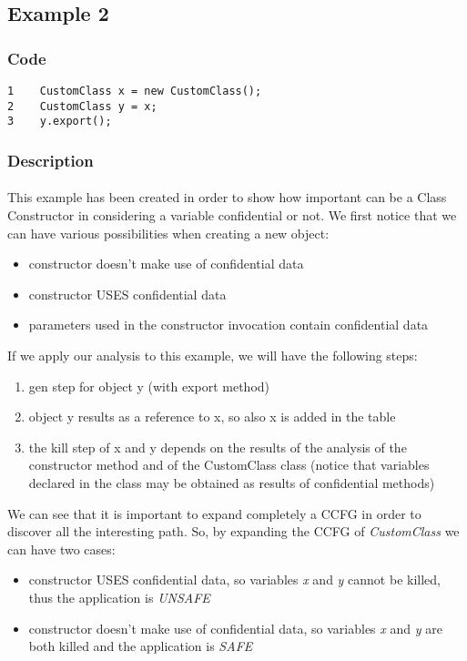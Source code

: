 \documentclass[letterpaper,twocolumn,10pt]{article}
\begin{document}
\subsection{Example 2}

\subsubsection{Code}
\begin{verbatim}
1    CustomClass x = new CustomClass();
2    CustomClass y = x;
3    y.export();
\end{verbatim}

\subsubsection{Description}
\paragraph{}
This example has been created in order to show how important can be a Class Constructor in considering a variable confidential or not. We first notice that we can have various possibilities when creating a new object:
\begin{itemize}
  \item constructor doesn't make use of confidential data
  \item constructor USES confidential data
  \item parameters used in the constructor invocation contain confidential data
\end{itemize}

If we apply our analysis to this example, we will have the following steps:

\begin{enumerate}
\item gen step for object y (with export method)
\item object y results as a reference to x, so also x is added in the table
\item the kill step of x and y depends on the results of the analysis of the constructor method and of the CustomClass class (notice that variables declared in the class may be obtained as results of confidential methods)
\end{enumerate}

We can see that it is important to expand completely a CCFG in order to discover all the interesting path. So, by expanding the CCFG of \emph{CustomClass} we can have two cases:
\begin{itemize}
  \item constructor USES confidential data, so variables \emph{x} and \emph{y} cannot be killed, thus the application is \emph{UNSAFE}
  \item constructor doesn't make use of confidential data, so variables \emph{x} and \emph{y} are  both killed and the application is \emph{SAFE}
\end{itemize}
\end{document}

